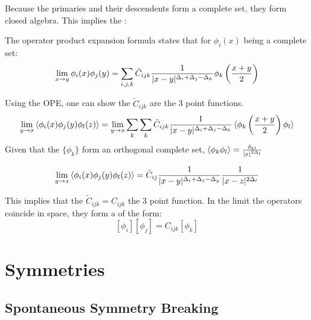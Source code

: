 \documentclass[11pt]{scrartcl}
\begin{document}
Because the primaries and their descendents form a complete set, they form  closed algebra.  This implies the :
\begin{theorem}
	The operator product expansion formula states that for $\phi_i(x)$ being a complete set:
	\begin{align}
		\lim_{x \rightarrow y} \phi_i(x) \phi_j(y) = \sum_{i, j, k} \tilde{C}_{ijk} {1 \over |x - y|^{\Delta_i + \Delta_j - \Delta_k}} \phi_k \left({x + y \over 2} \right)
		\end{align}
\end{theorem}

Using the OPE, one can show the $\tilde{C}_{ijk}$ are the 3 point functions.
\[\lim_{y \rightarrow x} \braket{\phi_i(x) \phi_j(y) \phi_l(z)}
= \lim_{y \rightarrow x} \sum_k \sum_{k} \tilde{C}_{ijk} {1 \over |x - y|^{\Delta_i + \Delta_j - \Delta_k}} \braket{\phi_k \left({x + y \over 2} \right)  \phi_l} \]
Given that the $\{ \phi_k \}$ form an orthogonal complete set, $\braket{\phi_k \phi_l} = {\delta_{kl} \over |x|^{2 \Delta_l}}$

\[\lim_{y \rightarrow x} \braket{\phi_i(x) \phi_j(y) \phi_l(z)}
= \tilde{C}_{ij} {1 \over |x - y|^{\Delta_i + \Delta_j - \Delta_y}} {1 \over |x - z|^{2 \Delta_l}} \]

This implies that the $\tilde{C}_{ijk} = C_{ijk}$ the 3 point function.  In the limit the operators coincide in space, they form a  of the form:
\[ [\phi_i][\phi_j] = C_{ijk}[\phi_k]\]


\section{Symmetries}
\subsection{Spontaneous Symmetry Breaking}
\end{document}
